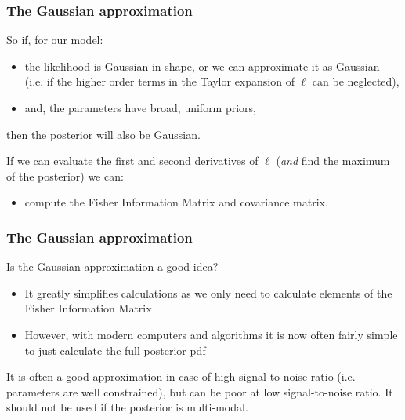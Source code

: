 \begin{frame}

\frametitle{The Gaussian approximation}
\label{thegaussianapproximation}

So if, for our model:

\begin{itemize}
\item the likelihood is Gaussian in shape, or we can approximate it as Gaussian (i.e. if the higher order
terms in the Taylor expansion of $\ell$ can be neglected),

\item and, the parameters have broad, uniform priors,

\end{itemize}

then the posterior will also be Gaussian.

If we can evaluate the first and second derivatives of $\ell$ (\emph{and} find the maximum of the
posterior) we can:

\begin{itemize}
\item compute the Fisher Information Matrix and covariance matrix.

\end{itemize}

\end{frame}

\begin{frame}

\frametitle{The Gaussian approximation}
\label{thegaussianapproximation}

Is the Gaussian approximation a good idea?

\begin{itemize}
\item It greatly simplifies calculations as we only need to calculate elements of the Fisher Information Matrix

\item However, with modern computers and algorithms it is now often fairly simple to just calculate the full posterior pdf

\end{itemize}

It is often a good approximation in case of high signal-to-noise ratio (i.e. parameters are well constrained), but
can be poor at low signal-to-noise ratio. It should not be used if the posterior is multi-modal.

\end{frame}

